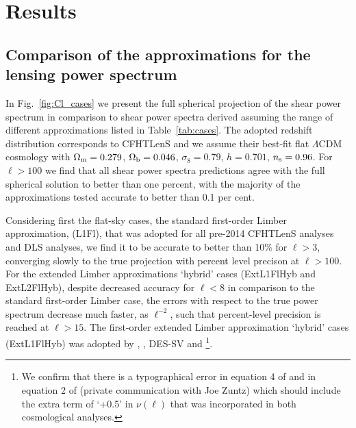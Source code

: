 \documentclass[fleqn,usenatbib]{mnras} %
\begin{document}
\section{Results}
\label{sec:results}

\subsection{Comparison of the approximations for the lensing power spectrum}
\label{sec:comp}


In Fig.~\ref{fig:Cl_cases} we present the full spherical projection of the
shear power spectrum in comparison to shear power spectra derived assuming the
range of different approximations listed in Table~\ref{tab:cases}.  The adopted
redshift distribution corresponds to CFHTLenS \citep{CFHTLenS-2pt-notomo} and
we assume their best-fit flat $\Lambda$CDM cosmology with $\Omega_{\rm
m}=0.279$, $\Omega_{\rm b}=0.046$, $\sigma_8=0.79$, $h=0.701$, $n_{\rm
s}=0.96$. For $\ell > 100$ we find that all shear power spectra predictions
agree with the full spherical solution to better than one percent, with the
majority of the approximations tested accurate to better than 0.1 per cent.   

Considering first the flat-sky cases, the standard first-order Limber
approximation, (L1Fl), that was adopted for all pre-2014 CFHTLenS analyses and
DLS analyses, we find it to be accurate to better than 10\% for $\ell>3$,
converging slowly to the true projection with percent level precison at
$\ell>100$. For the extended Limber approximations `hybrid' cases (ExtL1FlHyb
and ExtL2FlHyb), despite decreased accuracy for $\ell < 8$ in comparison to the
standard first-order Limber case, the errors with respect to the true power
spectrum decrease much faster, as $\ell^{-2}$, such that percent-level
precision is reached at $\ell>15$.  The first-order extended Limber
approximation `hybrid' cases (ExtL1FlHyb) was adopted by
\citet{joudaki/etal:2016}, \citet{joudaki/etal:2017}, DES-SV
\citep{abbott/etal:2016} and \cite{KiDS-450}\footnote{We confirm that there is
a typographical error in equation 4 of \cite{KiDS-450} and in equation 2 of
\citet{abbott/etal:2016} (private communication with Joe Zuntz) which should
include the extra term of `+0.5' in $\nu(\ell)$ that was incorporated in both
cosmological analyses.}. 
\end{document}
